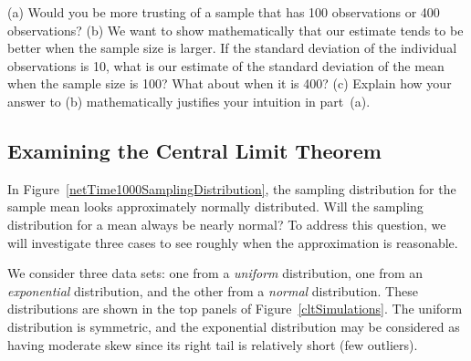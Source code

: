 
\begin{exercisewrap}
\begin{nexercise}
(a) Would you be more trusting of a sample that has 100 observations or 400 observations? (b) We want to show mathematically that our estimate tends to be better when the sample size is larger. If the standard deviation of the individual observations is 10, what is our estimate of the standard deviation of the mean when the sample size is 100? What about when it is 400? (c) Explain how your answer to (b) mathematically justifies your intuition in part~(a).\footnotemark
\end{nexercise}
\end{exercisewrap}


\D{\newpage}

\subsection{Examining the Central Limit Theorem}
\label{cltSection}


In Figure~\ref{netTime1000SamplingDistribution}, the sampling distribution for the sample mean looks approximately normally distributed. Will the sampling distribution for a mean always be nearly normal? To address this question, we will investigate three cases to see roughly when the approximation is reasonable.

We consider three data sets: one from a \emph{uniform} distribution, one from an \emph{exponential} distribution, and the other from a \emph{normal} distribution. These distributions are shown in the top panels of Figure~\ref{cltSimulations}. The uniform distribution is symmetric, and the exponential distribution may be considered as having moderate skew since its right tail is relatively short (few outliers).

